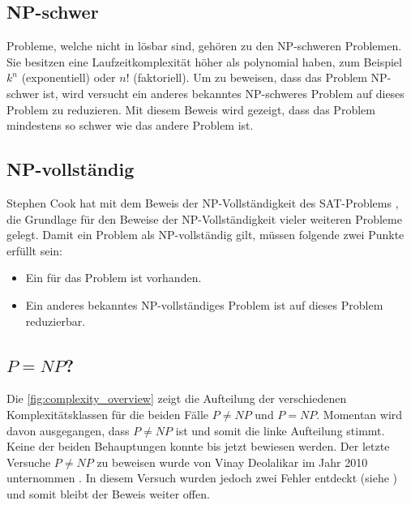 \subsection{NP-schwer}\label{np_hard}
Probleme, welche nicht in  lösbar sind, gehören zu den NP-schweren Problemen. Sie besitzen eine Laufzeitkomplexität höher als polynomial haben, zum Beispiel 
$k^n$ (exponentiell) oder $n!$ (faktoriell). Um zu beweisen, dass das Problem NP-schwer ist, wird versucht ein anderes bekanntes NP-schweres Problem auf dieses Problem zu reduzieren. Mit 
diesem Beweis wird gezeigt, dass das Problem mindestens so schwer wie das andere Problem ist.

\subsection{NP-vollständig}\label{np_complet}
Stephen Cook hat mit dem Beweis der NP-Vollständigkeit des SAT-Problems \cite{cook_complexity}, die Grundlage für den Beweise der NP-Vollständigkeit vieler weiteren Probleme 
gelegt. Damit ein Problem als NP-vollständig gilt, müssen folgende zwei Punkte erfüllt sein:
\begin{itemize}
	\item Ein  für das Problem ist vorhanden.
	\item Ein anderes bekanntes NP-vollständiges Problem ist auf dieses Problem reduzierbar.
\end{itemize}

\subsection{$P = NP$?}
Die \autoref{fig:complexity_overview} zeigt die Aufteilung der verschiedenen Komplexitätsklassen für die beiden Fälle $P \neq NP$ und $P=NP$. Momentan wird davon ausgegangen, 
dass $P \neq NP$ ist und somit die linke Aufteilung stimmt. Keine der beiden Behauptungen konnte bis jetzt bewiesen werden. Der letzte Versuche $P \neq NP$ zu beweisen wurde von 
Vinay Deolalikar im Jahr 2010 unternommen \cite{p_neq_np_paper}. In diesem Versuch wurden jedoch zwei Fehler entdeckt (siehe \cite{p_neq_np_paper_blog}) und somit bleibt der 
Beweis weiter offen.

